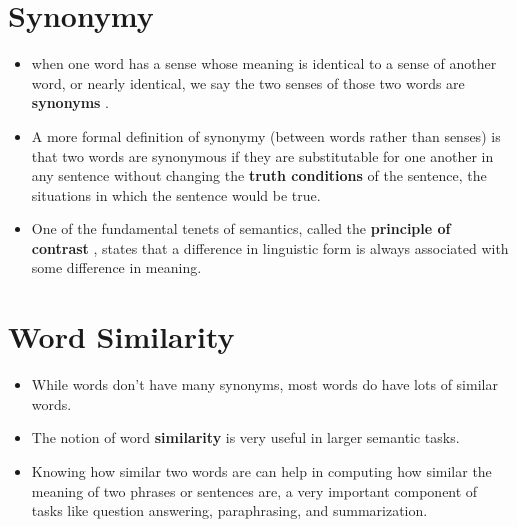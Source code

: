 \section{Synonymy \cite{nlp-1}}\label{Synonymy}
\begin{itemize}
    \item when one word has a sense whose meaning is identical to a sense of another word, or nearly identical, we say the two senses of those two words are \textbf{synonyms}  \label{synonyms}.

    \item A more formal definition of synonymy (between words rather than senses) is that two words are synonymous if they are substitutable for one another in any sentence without changing the \textbf{truth conditions} of the sentence, the situations in which the sentence would be true.

    \item One of the fundamental tenets of semantics, called the \textbf{principle of contrast} \label{principle of contrast}, states that a difference in linguistic form is always associated with some difference in meaning.
\end{itemize}


\section{Word Similarity \cite{nlp-1}}\label{Word Similarity}
\begin{itemize}
    \item While words don’t have many synonyms, most words do have lots of similar words.
    
    \item The notion of word \textbf{similarity} is very useful in larger semantic tasks.

    \item Knowing how similar two words are can help in computing how similar the meaning of two phrases or sentences are, a very important component of tasks like question answering, paraphrasing, and summarization.

    
\end{itemize}

